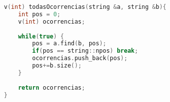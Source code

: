 \begin{lstlisting}[language=C++]
v(int) todasOcorrencias(string &a, string &b){
	int pos = 0;
	v(int) ocorrencias;
	
	while(true) {
		pos = a.find(b, pos);
		if(pos == string::npos) break;
		ocorrencias.push_back(pos);
		pos+=b.size();		
	}
	
	return ocorrencias;
}
\end{lstlisting}